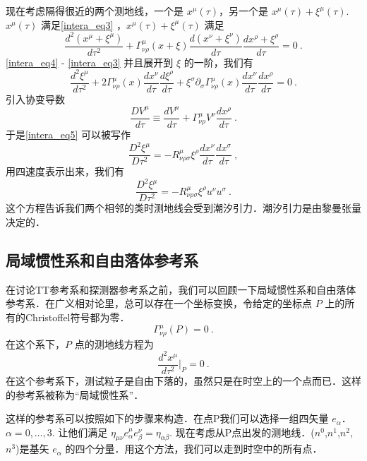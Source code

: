 现在考虑隔得很近的两个测地线，一个是 $x^\mu(\tau)$，另一个是 $x^\mu(\tau)+\xi^\mu(\tau)$. $x^\mu(\tau)$ 满足\autoref{intera_eq3} ，$x^\mu(\tau) + \xi^\mu(\tau)$ 满足
\begin{equation}\label{intera_eq4}
\frac{d^2(x^\mu+\xi^\mu)}{d\tau^2} + \Gamma^\mu_{\nu\rho} (x+\xi) \frac{d(x^\nu+\xi^\nu)}{d\tau} \frac{d x^\rho+\xi^\rho}{d \tau} = 0~.
\end{equation}
\autoref{intera_eq4} - \autoref{intera_eq3} 并且展开到 $\xi$ 的一阶，我们有
\begin{equation}\label{intera_eq5}
\frac{d^2 \xi^\mu}{d \tau^2} + 2 \Gamma^\mu_{\nu\rho} (x) \frac{dx^\nu}{d\tau} \frac{d\xi^\rho}{d\tau} + \xi^\sigma \partial_\sigma \Gamma^\mu_{\nu\rho} (x) \frac{dx^\nu}{d\tau} \frac{dx^\rho}{d\tau} = 0 ~. 
\end{equation}
引入协变导数
\begin{equation}
\frac{D V^\mu}{d\tau} \equiv \frac{d V^\mu}{d\tau} + \Gamma^\mu_{\nu\rho} V^\nu \frac{dx^\rho}{d\tau} ~.
\end{equation}
于是\autoref{intera_eq5} 可以被写作
\begin{equation}
\frac{D^2 \xi^\mu}{D \tau^2} = - R^\mu_{\nu\rho\sigma} \xi^\rho \frac{dx^\nu}{d\tau} \frac{dx^\sigma}{d\tau} ~,
\end{equation}
用四速度表示出来，我们有
\begin{equation}
\frac{D^2 \xi^\mu}{D\tau^2} = - R^\mu_{\nu\rho\sigma} \xi^\rho u^\nu u^\sigma ~. 
\end{equation}
这个方程告诉我们两个相邻的类时测地线会受到潮汐引力．潮汐引力是由黎曼张量决定的．

\subsection{局域惯性系和自由落体参考系}
在讨论TT参考系和探测器参考系之前，我们可以回顾一下局域惯性系和自由落体参考系．在广义相对论里，总可以存在一个坐标变换，令给定的坐标点 $P$ 上的所有的Christoffel符号都为零．
\begin{equation}
\Gamma^\mu_{\nu\rho} (P) = 0 ~.
\end{equation}
在这个系下，$P$ 点的测地线方程为
\begin{equation}
\frac{d^2 x^\mu}{d\tau^2} \bigg|_{P} = 0 ~.
\end{equation}
在这个参考系下，测试粒子是自由下落的，虽然只是在时空上的一个点而已．这样的参考系被称为“局域惯性系”．

这样的参考系可以按照如下的步骤来构造．在点P我们可以选择一组四矢量 $e_\alpha$．$\alpha = 0,\ldots,3$. 让他们满足 $\eta_{\mu\nu}e^\mu_\alpha e^\nu_\beta = \eta_{\alpha\beta}$. 现在考虑从P点出发的测地线．($n^0$,$n^1$,$n^2$,$n^3$)是基矢 $e_\alpha$ 的四个分量．用这个方法，我们可以走到时空中的所有点．

